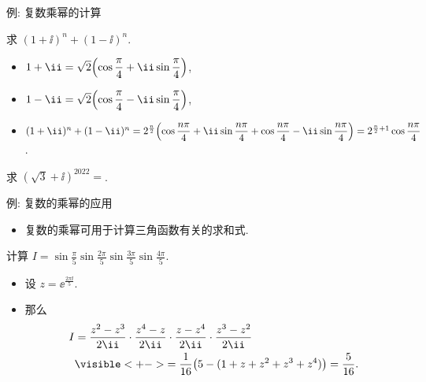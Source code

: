 \begin{frame}{例: 复数乘幂的计算}
	\onslide<+->
	\begin{example}[near]
		求 $(1+\ii)^n+(1-\ii )^n$.
	\end{example}
	\onslide<+->
	\begin{solution}[near,leftupper=0mm]
		\begin{itemize}
			\item $1+\ii=\sqrt2\Bigl(\cos\dfrac\pi4+\ii\sin\dfrac\pi4\Bigr)$,
			\item $1-\ii =\sqrt2\Bigl(\cos\dfrac\pi4-\ii \sin\dfrac\pi4\Bigr)$,
			\item $(1+\ii)^n+(1-\ii )^n
				=2^{\frac n2}\Bigl(\cos\dfrac{n\pi}4+\ii\sin\dfrac{n\pi}4+\cos\dfrac{n\pi}4-\ii \sin\dfrac{n\pi}4\Bigr)
				=2^{\frac n2+1}\cos\dfrac{n\pi}4$.
		\end{itemize}
	\end{solution}
	\onslide<+->
	\begin{exercise}[near]
		求 $(\sqrt3+\ii)^{2022}=$.
	\end{exercise}
\end{frame}


\begin{frame}{例: 复数的乘幂的应用\noexer}
	\begin{itemize}
		\item 复数的乘幂可用于计算三角函数有关的求和式.
	\end{itemize}
	\onslide<+->
	\begin{example}[near]
		计算 $\displaystyle I =\sin\frac{\pi}5\sin\frac{2\pi}5\sin\frac{3\pi}5\sin\frac{4\pi}5$.
	\end{example}
	\onslide<+->
	\begin{solution}[near,leftupper=0mm]
		\begin{itemize}
			\item 设 $z=\ee^{\frac{2\pi\ii}5}$.
			\item 那么
			\begin{align*}
				I&=\frac{z^2-z^3}{2\ii}\cdot
					\frac{z^4-z}{2\ii}\cdot
					\frac{z-z^4}{2\ii}\cdot
					\frac{z^3-z^2}{2\ii}\\&
				\visible<+->{=\dfrac1{16}\bigl(5-(1+z+z^2+z^3+z^4)\bigr)
				=\dfrac{5}{16}.}
			\end{align*}
		\end{itemize}
		\bigdel\bigdel
	\end{solution}
\end{frame}


